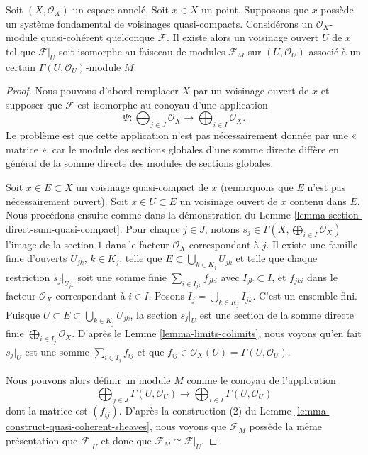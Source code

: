 \begin{lemma}
\label{lemma-quasi-coherent-module}
Soit $(X, \mathcal{O}_X)$ un espace annelé.
Soit $x \in X$ un point.
Supposons que $x$ possède un système fondamental de voisinages quasi-compacts.
Considérons un $\mathcal{O}_X$-module quasi-cohérent quelconque $\mathcal{F}$.
Il existe alors un voisinage ouvert $U$ de $x$
tel que $\mathcal{F}|_U$ soit isomorphe au
faisceau de modules $\mathcal{F}_M$ sur $(U, \mathcal{O}_U)$
associé à un certain $\Gamma(U, \mathcal{O}_U)$-module $M$.
\end{lemma}

\begin{proof}
Nous pouvons d'abord remplacer $X$ par un voisinage ouvert de $x$
et supposer que $\mathcal{F}$ est isomorphe au
conoyau d'une application
$$
\Psi :
\bigoplus\nolimits_{j \in J}
\mathcal{O}_X
\longrightarrow
\bigoplus\nolimits_{i \in I}
\mathcal{O}_X.
$$
Le problème est que cette application n'est pas nécessairement donnée par
une « matrice », car le module des sections globales d'une somme directe
diffère en général de la somme directe des modules
de sections globales.

\medskip\noindent
Soit $x \in E \subset X$ un voisinage quasi-compact
de $x$ (remarquons que $E$ n'est pas nécessairement ouvert).
Soit $x \in U \subset E$ un voisinage ouvert de
$x$ contenu dans $E$.
Nous procédons ensuite comme dans la démonstration du
Lemme \ref{lemma-section-direct-sum-quasi-compact}.
Pour chaque $j \in J$, notons
$s_j \in \Gamma(X, \bigoplus\nolimits_{i \in I} \mathcal{O}_X)$
l'image de la section $1$ dans le facteur $\mathcal{O}_X$
correspondant à $j$. Il existe une famille finie d'ouverts
$U_{jk}$, $k \in K_j$, telle que $E \subset \bigcup_{k \in K_j} U_{jk}$
et telle que chaque restriction $s_j|_{U_{jk}}$
soit une somme finie $\sum_{i \in I_{jk}} f_{jki}$
avec $I_{jk} \subset I$, et $f_{jki}$ dans le facteur
$\mathcal{O}_X$ correspondant à $i \in I$. Posons
$I_j = \bigcup_{k \in K_j} I_{jk}$. C'est un ensemble fini.
Puisque $U \subset E \subset \bigcup_{k \in K_j} U_{jk}$,
la section $s_j|_U$ est une section de la somme directe finie
$\bigoplus_{i \in I_j} \mathcal{O}_X$.
D'après le Lemme \ref{lemma-limits-colimits},
nous voyons qu'en fait $s_j|_U$ est une somme
$\sum_{i \in I_j} f_{ij}$ et que
$f_{ij} \in \mathcal{O}_X(U) = \Gamma(U, \mathcal{O}_U)$.

\medskip\noindent
Nous pouvons alors définir un module $M$ comme le conoyau de l'application
$$
\bigoplus\nolimits_{j \in J}
\Gamma(U, \mathcal{O}_U)
\longrightarrow
\bigoplus\nolimits_{i \in I}
\Gamma(U, \mathcal{O}_U)
$$
dont la matrice est $(f_{ij})$. D'après la construction (2) du
Lemme \ref{lemma-construct-quasi-coherent-sheaves}, nous voyons que
$\mathcal{F}_M$ possède la même présentation que $\mathcal{F}|_U$
et donc que $\mathcal{F}_M \cong \mathcal{F}|_U$.
\end{proof}

